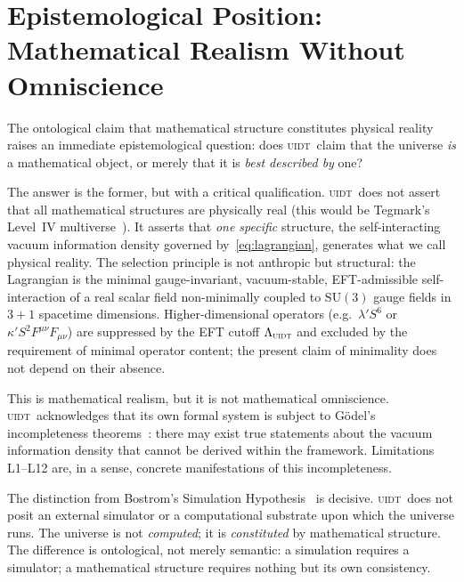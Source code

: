 \documentclass[12pt,a4paper,twoside]{article}
\theoremstyle{plain}
\theoremstyle{definition}
\theoremstyle{remark}
\newcommand{\UIDT}{\textsc{uidt}}
\begin{document}
\newpage
\section{Epistemological Position: Mathematical Realism Without Omniscience}
\label{sec:epistemology}

The ontological claim that mathematical structure constitutes physical reality
raises an immediate epistemological question: does \UIDT\ claim that the
universe \emph{is} a mathematical object, or merely that it is \emph{best
described by} one?

The answer is the former, but with a critical qualification. \UIDT\ does not
assert that all mathematical structures are physically real (this would be
Tegmark's Level~IV multiverse~\cite{Tegmark2008}). It asserts that
\emph{one specific} structure, the self-interacting vacuum information
density governed by~\eqref{eq:lagrangian}, generates what we call physical
reality. The selection principle is not anthropic but structural: the Lagrangian is the minimal gauge-invariant, vacuum-stable, EFT-admissible
self-interaction of a real scalar field non-minimally coupled to $\mathrm{SU}(3)$
gauge fields in $3+1$ spacetime dimensions.  Higher-dimensional operators
(e.g.\ $\lambda' S^6$ or $\kappa' S^2 F^{\mu\nu}F_{\mu\nu}$) are suppressed
by the EFT cutoff $\Lambda_{\UIDT}$ and excluded by the requirement of
minimal operator content; the present claim of minimality does not depend on
their absence.

This is mathematical realism, but it is not mathematical omniscience. \UIDT\
acknowledges that its own formal system is subject to G\"odel's incompleteness
theorems~\cite{Goedel1931}: there may exist true statements about the vacuum
information density that cannot be derived within the framework. Limitations
L1--L12 are, in a sense, concrete manifestations of this incompleteness.

The distinction from Bostrom's Simulation Hypothesis~\cite{Bostrom2003} is
decisive. \UIDT\ does not posit an external simulator or a computational
substrate upon which the universe runs. The universe is not \emph{computed};
it is \emph{constituted} by mathematical structure. The difference is
ontological, not merely semantic: a simulation requires a simulator; a
mathematical structure requires nothing but its own consistency.

\newpage
\end{document}

